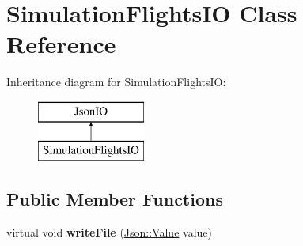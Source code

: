 \hypertarget{class_simulation_flights_i_o}{}\section{Simulation\+Flights\+I\+O Class Reference}
\label{class_simulation_flights_i_o}
Inheritance diagram for Simulation\+Flights\+I\+O\+:\begin{figure}[H]
\begin{center}
\leavevmode
\includegraphics[height=2.000000cm]{class_simulation_flights_i_o}
\end{center}
\end{figure}
\subsection*{Public Member Functions}
\begin{DoxyCompactItemize}
\item 
\hypertarget{class_simulation_flights_i_o_aab1dd1c43b626e70bc60d4b79d703597}{}virtual void {\bfseries write\+File} (\hyperlink{class_json_1_1_value}{Json\+::\+Value} value)\label{class_simulation_flights_i_o_aab1dd1c43b626e70bc60d4b79d703597}

\end{DoxyCompactItemize}
